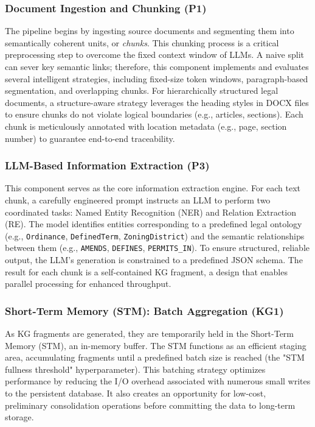 \subsubsection{Document Ingestion and Chunking (P1)}
The pipeline begins by ingesting source documents and segmenting them into semantically coherent units, or \textit{chunks}. This chunking process is a critical preprocessing step to overcome the fixed context window of LLMs. A naive split can sever key semantic links; therefore, this component implements and evaluates several intelligent strategies, including fixed-size token windows, paragraph-based segmentation, and overlapping chunks. For hierarchically structured legal documents, a structure-aware strategy leverages the heading styles in DOCX files to ensure chunks do not violate logical boundaries (e.g., articles, sections). Each chunk is meticulously annotated with location metadata (e.g., page, section number) to guarantee end-to-end traceability.

\subsubsection{LLM-Based Information Extraction (P3)}
This component serves as the core information extraction engine. For each text chunk, a carefully engineered prompt instructs an LLM to perform two coordinated tasks: Named Entity Recognition (NER) and Relation Extraction (RE). The model identifies entities corresponding to a predefined legal ontology (e.g., \texttt{Ordinance}, \texttt{DefinedTerm}, \texttt{ZoningDistrict}) and the semantic relationships between them (e.g., \texttt{AMENDS}, \texttt{DEFINES}, \texttt{PERMITS\_IN}). To ensure structured, reliable output, the LLM’s generation is constrained to a predefined JSON schema. The result for each chunk is a self-contained KG fragment, a design that enables parallel processing for enhanced throughput.

\subsubsection{Short-Term Memory (STM): Batch Aggregation (KG1)}
As KG fragments are generated, they are temporarily held in the Short-Term Memory (STM), an in-memory buffer. The STM functions as an efficient staging area, accumulating fragments until a predefined batch size is reached (the "STM fullness threshold" hyperparameter). This batching strategy optimizes performance by reducing the I/O overhead associated with numerous small writes to the persistent database. It also creates an opportunity for low-cost, preliminary consolidation operations before committing the data to long-term storage.

